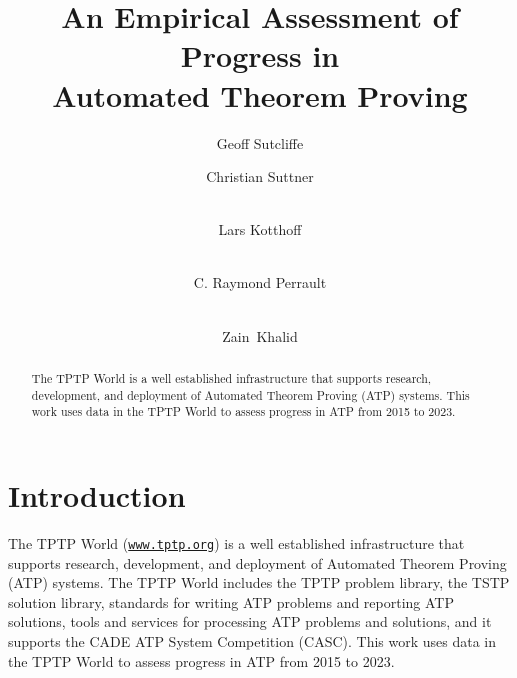 \documentclass[runningheads]{llncs}
\begin{document}
\title{An Empirical Assessment of Progress in \\ Automated Theorem Proving}

\author{
Geoff Sutcliffe\Envelope
\and
Christian Suttner
\and \\
Lars Kotthoff
\and \\
C. Raymond Perrault
\and \\
Zain~Khalid
}

\maketitle
\begin{abstract}
The TPTP World is a well established infrastructure that supports research, development, and 
deployment of Automated Theorem Proving (ATP) systems.
This work uses data in the TPTP World to assess progress in ATP from 2015 to 2023.

\end{abstract}
\section{Introduction}
\label{Introduction}

The TPTP World \cite{Sut17} (\href{https://www.tptp.org}{\tt www.tptp.org}) is a well established 
infrastructure that supports research, development, and deployment of Automated Theorem Proving 
(ATP) systems.
The TPTP World includes the TPTP problem library,
the TSTP solution library,
standards for writing ATP problems and reporting ATP solutions,
tools and services for processing ATP problems and solutions,
and it supports the CADE ATP System Competition (CASC).
This work uses data in the TPTP World to assess progress in ATP from 2015 to 2023.
\end{document}
